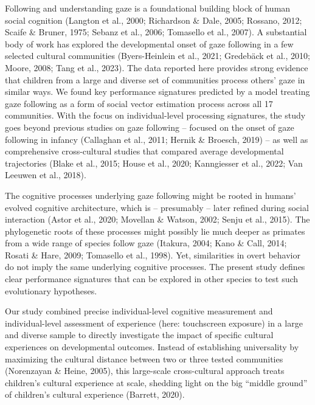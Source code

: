 \documentclass[
  man,floatsintext]{apa7}
\begin{document}
Following and understanding gaze is a foundational building block of human social cognition (Langton et al., 2000; Richardson \& Dale, 2005; Rossano, 2012; Scaife \& Bruner, 1975; Sebanz et al., 2006; Tomasello et al., 2007). A substantial body of work has explored the developmental onset of gaze following in a few selected cultural communities (Byers-Heinlein et al., 2021; Gredebäck et al., 2010; Moore, 2008; Tang et al., 2023). The data reported here provides strong evidence that children from a large and diverse set of communities process others' gaze in similar ways. We found key performance signatures predicted by a model treating gaze following as a form of social vector estimation process across all 17 communities. With the focus on individual-level processing signatures, the study goes beyond previous studies on gaze following -- focused on the onset of gaze following in infancy (Callaghan et al., 2011; Hernik \& Broesch, 2019) -- as well as comprehensive cross-cultural studies that compared average developmental trajectories (Blake et al., 2015; House et al., 2020; Kanngiesser et al., 2022; Van Leeuwen et al., 2018).

The cognitive processes underlying gaze following might be rooted in humans' evolved cognitive architecture, which is -- presumably -- later refined during social interaction (Astor et al., 2020; Movellan \& Watson, 2002; Senju et al., 2015). The phylogenetic roots of these processes might possibly lie much deeper as primates from a wide range of species follow gaze (Itakura, 2004; Kano \& Call, 2014; Rosati \& Hare, 2009; Tomasello et al., 1998). Yet, similarities in overt behavior do not imply the same underlying cognitive processes. The present study defines clear performance signatures that can be explored in other species to test such evolutionary hypotheses.

Our study combined precise individual-level cognitive measurement and individual-level assessment of experience (here: touchscreen exposure) in a large and diverse sample to directly investigate the impact of specific cultural experiences on developmental outcomes. Instead of establishing universality by maximizing the cultural distance between two or three tested communities (Norenzayan \& Heine, 2005), this large-scale cross-cultural approach treats children's cultural experience at scale, shedding light on the big ``middle ground'' of children's cultural experience (Barrett, 2020).
\end{document}
